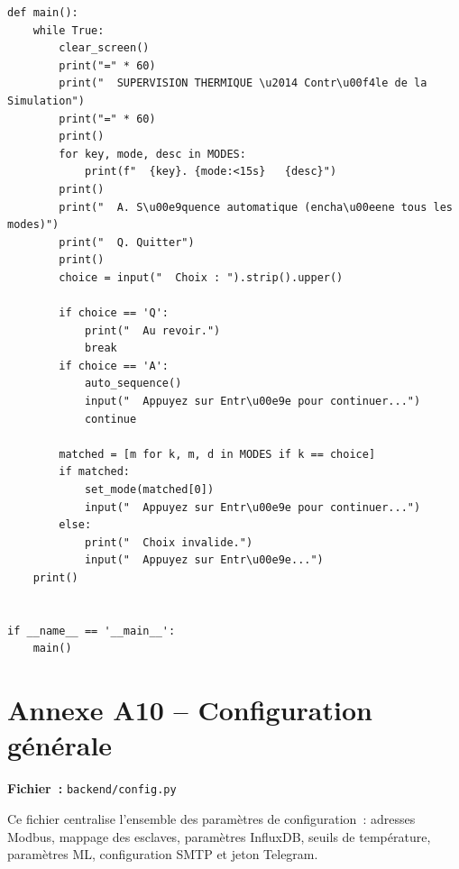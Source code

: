\begin{lstlisting}
def main():
    while True:
        clear_screen()
        print("=" * 60)
        print("  SUPERVISION THERMIQUE \u2014 Contr\u00f4le de la Simulation")
        print("=" * 60)
        print()
        for key, mode, desc in MODES:
            print(f"  {key}. {mode:<15s}   {desc}")
        print()
        print("  A. S\u00e9quence automatique (encha\u00eene tous les modes)")
        print("  Q. Quitter")
        print()
        choice = input("  Choix : ").strip().upper()

        if choice == 'Q':
            print("  Au revoir.")
            break
        if choice == 'A':
            auto_sequence()
            input("  Appuyez sur Entr\u00e9e pour continuer...")
            continue

        matched = [m for k, m, d in MODES if k == choice]
        if matched:
            set_mode(matched[0])
            input("  Appuyez sur Entr\u00e9e pour continuer...")
        else:
            print("  Choix invalide.")
            input("  Appuyez sur Entr\u00e9e...")
    print()


if __name__ == '__main__':
    main()
\end{lstlisting}

\section{Annexe A10 -- Configuration générale}
\label{annexe:config}

\textbf{Fichier~:} \texttt{backend/config.py}

Ce fichier centralise l'ensemble des paramètres de configuration~: adresses Modbus, mappage des esclaves, paramètres InfluxDB, seuils de température, paramètres ML, configuration SMTP et jeton Telegram.

